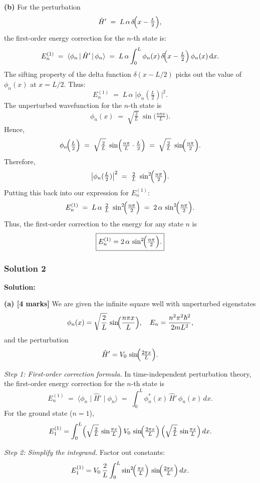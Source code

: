 \documentclass{article}
\begin{document}
\textbf{(b)} For the perturbation
\[
\hat{H}' \;=\; L\,\alpha \,\delta\!\Bigl(x-\tfrac{L}{2}\Bigr),
\]
the first-order energy correction for the \(n\)-th state is:
\[
E_n^{(1)} \;=\; \langle \phi_n \,\vert\, \hat{H}' \,\vert\, \phi_n \rangle 
\;=\; L\,\alpha\int_{0}^{L}\phi_n(x)\,\delta\!\Bigl(x-\tfrac{L}{2}\Bigr)\,\phi_n(x)\,\mathrm{d}x.
\]
The sifting property of the delta function \(\delta(x - L/2)\) picks out the value of \(\phi_n(x)\) at \(x=L/2\). Thus:
\[
E_n^{(1)} \;=\; L\,\alpha\;\bigl|\phi_n(\tfrac{L}{2})\bigr|^2.
\]
The unperturbed wavefunction for the \(n\)-th state is
\[
\phi_{n}(x) \;=\; \sqrt{\tfrac{2}{L}}\;\sin\!\bigl(\tfrac{n\pi x}{L}\bigr).
\]
Hence,
\[
\phi_n\!\Bigl(\tfrac{L}{2}\Bigr)
\;=\;
\sqrt{\tfrac{2}{L}}\;\sin\Bigl(\tfrac{n\pi}{L}\cdot\tfrac{L}{2}\Bigr)
\;=\;
\sqrt{\tfrac{2}{L}}\;\sin\!\Bigl(\tfrac{n\pi}{2}\Bigr).
\]
Therefore,
\[
\bigl|\phi_n(\tfrac{L}{2})\bigr|^2
\;=\;
\tfrac{2}{L}\;\sin^2\!\Bigl(\tfrac{n\pi}{2}\Bigr).
\]
Putting this back into our expression for \(E_n^{(1)}\):
\[
E_n^{(1)} 
\;=\;
L\,\alpha
\;\tfrac{2}{L}
\;\sin^2\!\Bigl(\tfrac{n\pi}{2}\Bigr)
\;=\;
2\,\alpha\,\sin^2\!\Bigl(\tfrac{n\pi}{2}\Bigr).
\]
Thus, the first-order correction to the energy for any state \(n\) is
\[
\boxed{E_n^{(1)} = 2\,\alpha\,\sin^2\!\Bigl(\tfrac{n\pi}{2}\Bigr).}
\]


\subsubsection{Solution 2}

\textbf{Solution:}

\textbf{(a) [4 marks]}  
We are given the infinite square well with unperturbed eigenstates
\[
\phi_n(x) = \sqrt{\frac{2}{L}}\,\sin\!\Bigl(\frac{n\pi x}{L}\Bigr), 
\quad 
E_n = \frac{n^2 \pi^2 \hbar^2}{2mL^2},
\]
and the perturbation
\[
\hat{H}' = V_0 \,\sin\!\Bigl(\tfrac{2\pi x}{L}\Bigr).
\]

\textit{Step 1: First-order correction formula.}  
In time-independent perturbation theory, the first-order energy correction for the \(\!n\)-th state is
\[
E_n^{(1)} \;=\; \langle \phi_n \!\mid \hat{H}' \mid\! \phi_n \rangle 
\;=\; \int_{0}^{L} \phi_n^*(x)\,\hat{H}'\,\phi_n(x)\,dx.
\]
For the ground state (\(n=1\)),
\[
E_1^{(1)} 
= \int_{0}^{L} 
\Bigl(\sqrt{\tfrac{2}{L}}\,\sin\!\tfrac{\pi x}{L}\Bigr)
\,V_0 \,\sin\!\Bigl(\tfrac{2\pi x}{L}\Bigr)\,
\Bigl(\sqrt{\tfrac{2}{L}}\,\sin\!\tfrac{\pi x}{L}\Bigr)
\,dx.
\]

\textit{Step 2: Simplify the integrand.}  
Factor out constants:
\[
E_1^{(1)} 
= V_0 \,\frac{2}{L}
\int_{0}^{L} 
\sin^{2}\!\Bigl(\tfrac{\pi x}{L}\Bigr)\,
\sin\!\Bigl(\tfrac{2\pi x}{L}\Bigr)\,dx.
\]
\end{document}
